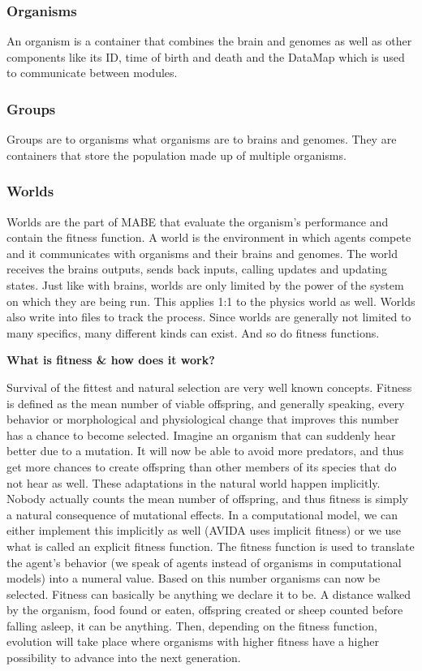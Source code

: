 \documentclass[12pt,oneside,listof=totoc,paper=a4,headings=small]{scrbook}
\begin{document}
\subsubsection{Organisms}
An organism is a container that combines the brain and genomes as well as other components like its ID, time of birth and death and the DataMap which is used to communicate between modules.


\subsubsection{Groups}
Groups are to organisms what organisms are to brains and genomes. They are containers that store the population made up of multiple organisms.

\newpage

\subsubsection{Worlds}
Worlds are the part of MABE that evaluate the organism's performance and contain the fitness function. A world is the environment in which agents compete and it communicates with organisms and their brains and genomes. The world receives the brains outputs, sends back inputs, calling updates and updating states. Just like with brains, worlds are only limited by the power of the system on which they are being run. This applies 1:1 to the physics world as well. Worlds also write into files to track the process. 
Since worlds are generally not limited to many specifics, many different kinds can exist. And so do  fitness functions.

\textbf{What is fitness \& how does it work?} 

Survival of the fittest and natural selection are very well known concepts. Fitness is defined as the mean number of viable offspring, and generally speaking, every behavior or morphological and physiological change that improves this number has a chance to become selected. Imagine an organism that can suddenly hear better due to a mutation. It will now be able to avoid more predators, and thus get more chances to create offspring than other members of its species that do not hear as well. These adaptations in the natural world happen implicitly. Nobody actually counts the mean number of offspring, and thus fitness is simply a natural consequence of mutational effects. In a computational model, we can either implement this implicitly as well (AVIDA uses implicit fitness) or we use what is called an explicit fitness function. The fitness function is used to translate the agent's behavior (we speak of agents instead of organisms in computational models) into a numeral value. Based on this number organisms can now be selected. Fitness can basically be anything we declare it to be. A distance walked by the organism, food found or eaten, offspring created or sheep counted before falling asleep, it can be anything. Then, depending on the fitness function, evolution will take place where organisms with higher fitness have a higher possibility to advance into the next generation.
\end{document}
